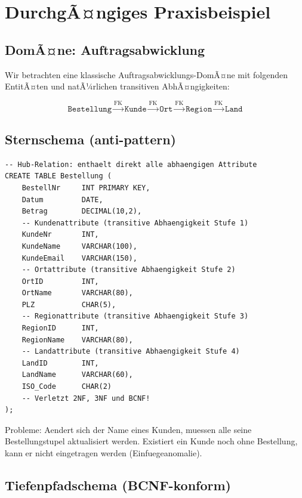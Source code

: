 ﻿\documentclass[a4paper,12pt]{report}
\theoremstyle{definition}
\theoremstyle{remark}
\begin{document}
\section{DurchgÃ¤ngiges Praxisbeispiel}
\label{sec:beispiel}

\subsection{DomÃ¤ne: Auftragsabwicklung}

Wir betrachten eine klassische Auftragsabwicklungs-DomÃ¤ne mit folgenden
EntitÃ¤ten und natÃ¼rlichen transitiven AbhÃ¤ngigkeiten:

\[
  \texttt{Bestellung} \xrightarrow{\text{FK}} \texttt{Kunde}
  \xrightarrow{\text{FK}} \texttt{Ort}
  \xrightarrow{\text{FK}} \texttt{Region}
  \xrightarrow{\text{FK}} \texttt{Land}
\]

\subsection{Sternschema (anti-pattern)}

\begin{lstlisting}[caption={Anti-Pattern: Sternschema mit denormalisierten Attributen in Hub-Relation},label=lst:stern]
-- Hub-Relation: enthaelt direkt alle abhaengigen Attribute
CREATE TABLE Bestellung (
    BestellNr     INT PRIMARY KEY,
    Datum         DATE,
    Betrag        DECIMAL(10,2),
    -- Kundenattribute (transitive Abhaengigkeit Stufe 1)
    KundeNr       INT,
    KundeName     VARCHAR(100),
    KundeEmail    VARCHAR(150),
    -- Ortattribute (transitive Abhaengigkeit Stufe 2)
    OrtID         INT,
    OrtName       VARCHAR(80),
    PLZ           CHAR(5),
    -- Regionattribute (transitive Abhaengigkeit Stufe 3)
    RegionID      INT,
    RegionName    VARCHAR(80),
    -- Landattribute (transitive Abhaengigkeit Stufe 4)
    LandID        INT,
    LandName      VARCHAR(60),
    ISO_Code      CHAR(2)
    -- Verletzt 2NF, 3NF und BCNF!
);
\end{lstlisting}

Probleme: Aendert sich der Name eines Kunden, muessen alle seine
Bestellungstupel aktualisiert werden. Existiert ein Kunde noch ohne
Bestellung, kann er nicht eingetragen werden (Einfuegeanomalie).

\subsection{Tiefenpfadschema (BCNF-konform)}
\end{document}
